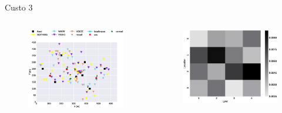 \begin{frame}{Custo 3}
        \begin{columns}
            \begin{column}{0.65\textwidth}
               \begin{figure}[!htb]
                    \includegraphics[width=\textwidth]{custo_3/590_uav_loc.eps}
                \end{figure}
            \end{column}
            \begin{column}{0.45\textwidth}
               \begin{figure}[!htb]
                    \includegraphics[width=\textwidth]{custo_3/590_bij_.eps}

\end{figure}
\end{column}
\end{columns}
\end{frame}
